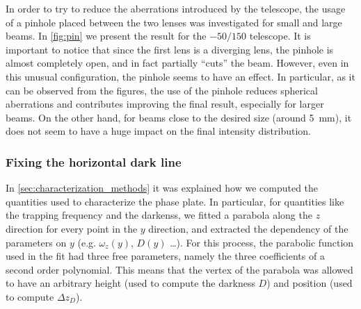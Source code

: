 In order to try to reduce the aberrations introduced by the telescope, the usage of a pinhole placed between the two lenses was investigated for small and large beams. In \cref{fig:pin} we present the result for the $-50/150$ telescope. It is important to notice that since the first lens is a diverging lens, the pinhole is almost completely open, and in fact partially \enquote{cuts} the beam. However, even in this unusual configuration, the pinhole seems to have an effect. In particular, as it can be observed from the figures, the use of the pinhole reduces spherical aberrations and contributes improving the final result, especially for larger beams. On the other hand, for beams close to the desired size (around \SI{5}{mm}), it does not seem to have a huge impact on the final intensity distribution.

\subsubsection{Fixing the horizontal dark line}
In \cref{sec:characterization_methods} it was explained how we computed the quantities used to characterize the phase plate. In particular, for quantities like the trapping frequency and the darkenss, we fitted a parabola along the $z$ direction for every point in the $y$ direction, and extracted the dependency of the parameters on $y$ (e.g. $\omega_z(y)$, $D(y)$ \dots). For this process, the parabolic function used in the fit had three free parameters, namely the three coefficients of a second order polynomial. This means that the vertex of the parabola was allowed to have an arbitrary height (used to compute the darkness $D$) and position (used to compute $\Delta z_D$).

